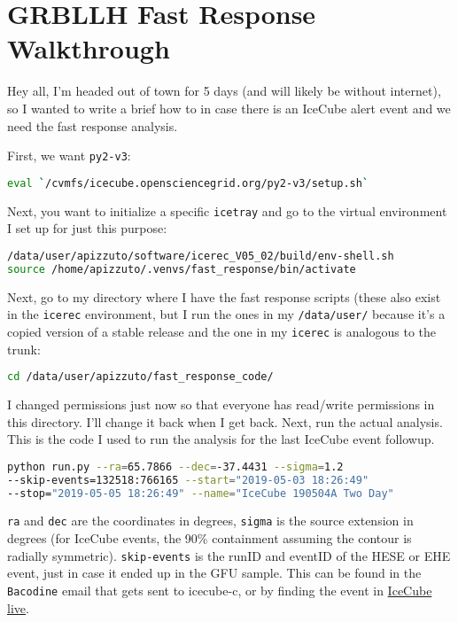 \chapter{GRBLLH Fast Response Walkthrough}

Hey all, I'm headed out of town for 5 days (and will likely be without internet), so I wanted to write a brief how to in case there is an IceCube alert event and we need the fast response analysis. 

First, we want \texttt{py2-v3}:
\begin{lstlisting}[language=bash]
eval `/cvmfs/icecube.opensciencegrid.org/py2-v3/setup.sh`
\end{lstlisting}

Next, you want to initialize a specific \texttt{icetray} and go to the virtual environment I set up for just this purpose: 

\begin{lstlisting}[language=bash]
/data/user/apizzuto/software/icerec_V05_02/build/env-shell.sh 
source /home/apizzuto/.venvs/fast_response/bin/activate
\end{lstlisting}

Next, go to my directory where I have the fast response scripts (these also exist in the \texttt{icerec} environment, but I run the ones in my \texttt{/data/user/} because it's a copied version of a stable release and the one in my \texttt{icerec} is analogous to the trunk: 

\begin{lstlisting}[language=bash]
cd /data/user/apizzuto/fast_response_code/
\end{lstlisting}

I changed permissions just now so that everyone has read/write permissions in this directory. I'll change it back when I get back. Next, run the actual analysis. This is the code I used to run the analysis for the last IceCube event followup. 

\begin{lstlisting}[language=bash]
python run.py --ra=65.7866 --dec=-37.4431 --sigma=1.2 
--skip-events=132518:766165 --start="2019-05-03 18:26:49" 
--stop="2019-05-05 18:26:49" --name="IceCube 190504A Two Day"
\end{lstlisting}

\texttt{ra} and \texttt{dec} are the coordinates in degrees, \texttt{sigma} is the source extension in degrees (for IceCube events, the 90\% containment assuming the contour is radially symmetric). \texttt{skip-events} is the runID and eventID of the HESE or EHE event, just in case it ended up in the GFU sample. This can be found in the \texttt{Bacodine} email that gets sent to icecube-c, or by finding the event in \href{https://live.icecube.wisc.edu/auth/?next=/realtime/}{IceCube live}. 

